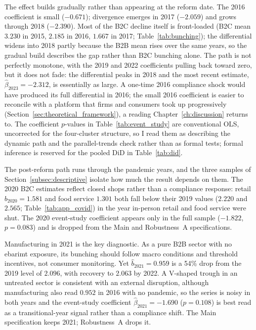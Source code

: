 \documentclass[12pt,oneside,a4paper]{report}
\begin{document}
The effect builds gradually rather than appearing at the reform date. The 2016 coefficient is small ($-0.671$); divergence emerges in 2017 ($-2.059$) and grows through 2018 ($-2.390$). Most of the B2C decline itself is front-loaded (B2C mean $3.230$ in 2015, $2.185$ in 2016, $1.667$ in 2017; Table~\ref{tab:bunching}); the differential widens into 2018 partly because the B2B mean rises over the same years, so the gradual build describes the gap rather than B2C bunching alone. The path is not perfectly monotone, with the 2019 and 2022 coefficients pulling back toward zero, but it does not fade: the differential peaks in 2018 and the most recent estimate, $\hat{\beta}_{2023} = -2.312$, is essentially as large. A one-time 2016 compliance shock would have produced its full differential in 2016; the small 2016 coefficient is easier to reconcile with a platform that firms and consumers took up progressively (Section~\ref{sec:theoretical_framework}), a reading Chapter~\ref{ch:discussion} returns to. The coefficient $p$-values in Table~\ref{tab:event_study} are conventional OLS, uncorrected for the four-cluster structure, so I read them as describing the dynamic path and the parallel-trends check rather than as formal tests; formal inference is reserved for the pooled DiD in Table~\ref{tab:did}.

The post-reform path runs through the pandemic years, and the three samples of Section~\ref{subsec:descriptive} isolate how much the result depends on them. The 2020 B2C estimates reflect closed shops rather than a compliance response: retail $\hat{b}_{2020} = 1.581$ and food service $1.301$ both fall below their 2019 values ($2.220$ and $2.565$; Table~\ref{tab:app_covid}) in the year in-person retail and food service were shut. The 2020 event-study coefficient appears only in the full sample ($-1.822$, $p = 0.083$) and is dropped from the Main and Robustness~A specifications.

Manufacturing in 2021 is the key diagnostic. As a pure B2B sector with no ebarimt exposure, its bunching should follow macro conditions and threshold incentives, not consumer monitoring. Yet $\hat{b}_{2021} = 0.959$ is a 54\% drop from the 2019 level of $2.096$, with recovery to $2.063$ by 2022. A V-shaped trough in an untreated sector is consistent with an external disruption, although manufacturing also read $0.952$ in 2016 with no pandemic, so the series is noisy in both years and the event-study coefficient $\hat{\beta}_{2021} = -1.690$ ($p = 0.108$) is best read as a transitional-year signal rather than a compliance shift. The Main specification keeps 2021; Robustness~A drops it.
\end{document}
